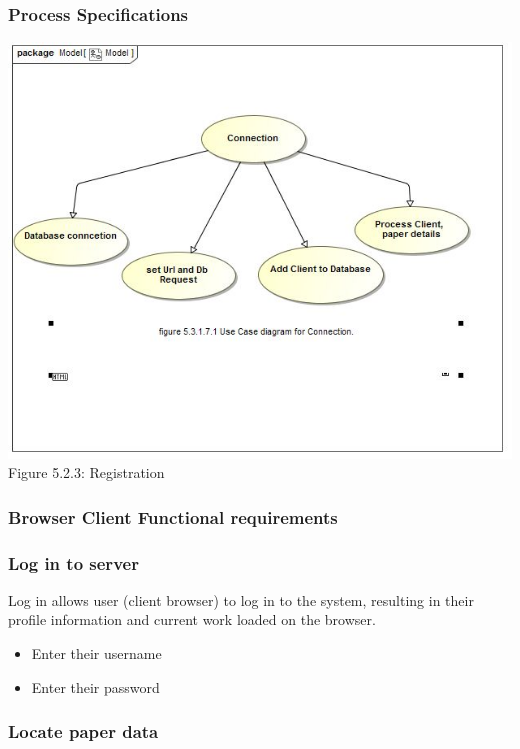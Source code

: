 \documentclass[hidelinks,a4paper,12pt]{article}
\begin{document}
	\subsubsection{Process Specifications}
	
	\includegraphics[width=1\textwidth]{./Graphs/UseCaseforConnection.jpg}\\[0.4cm]
	
		Figure 5.2.3: Registration
		

	\subsubsection{Browser Client Functional requirements}
		
		\subsubsection{Log in to server}
		
		Log in allows user (client browser) to log in to the system, resulting 
		in their profile information and current work loaded on the browser.  
		
		\begin{itemize}
			\item Enter their username
			\item Enter their password
		\end{itemize}
		
		\subsubsection{Locate paper data}
		
\end{document}
